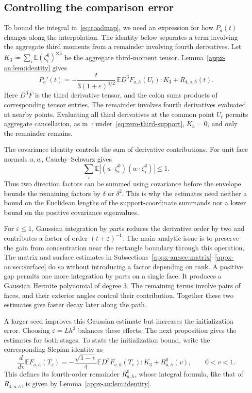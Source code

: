\documentclass[11pt,letterpaper]{article}
\theoremstyle{remark}
\newcommand{\E}{\mathbb E}
\begin{document}
\subsection{Controlling the comparison error}
\label{sec:outline-seeded}

To bound the integral in~\eqref{eq:roadmap}, we need an expression
for how \(P_a(t)\) changes along the interpolation. The identity below
separates a term involving the aggregate third moments from a remainder
involving fourth derivatives. Let
\(K_3\coloneqq\sum_i\E(\zeta_i^0)^{\otimes3}\) be the aggregate
third-moment tensor. Lemma~\ref{appx-an:lem:identity} gives
\begin{equation}
 P_a'(t)=
 -\frac{t}{3(1+\varepsilon)^{3/2}}\,
       \E D^3F_{a,h}(U_t):K_3+R_{4,a,h}(t).
 \label{eq:path-summary}
\end{equation}
Here \(D^3F\) is the third derivative tensor, and the colon sums
products of corresponding tensor entries. The remainder involves
fourth derivatives evaluated at nearby points. Evaluating all third
derivatives at the common point \(U_t\) permits aggregate cancellation,
as in~\cite[Lemma~22]{GaoZhang}: under~\eqref{eq:zero-third-support},
\(K_3=0\), and only the remainder remains.

The covariance identity controls the sum of derivative contributions.
For unit face normals \(u,w\), Cauchy--Schwarz gives
\[
 \sum_i\E|(u\cdot\zeta_i^0)(w\cdot\zeta_i^0)|\le1.
\]
Thus two direction factors can be summed using covariance before
the envelope bounds the remaining factors by \(\delta\) or
\(\delta^2\). This is why the estimates need neither a bound on the
Euclidean lengths of the support-coordinate summands nor a lower
bound on the positive covariance eigenvalues.

For \(\varepsilon\le1\), Gaussian integration by parts reduces the
derivative order by two and contributes a factor of order
\((t+\varepsilon)^{-1}\).
The main analytic issue is to preserve the gain from concentration
near the rectangle boundary through this operation.
The matrix and surface estimates in
Subsections~\ref{appx-an:sec:matrix}--\ref{appx-an:sec:surface}
do so without introducing a factor depending on rank. A positive gap
permits one more integration by parts on a single face. It produces a
Gaussian Hermite polynomial of degree \(3\). The remaining terms involve
pairs of faces, and their exterior angles control their contribution.
Together these two estimates give faster decay later along the path.

A larger seed improves this Gaussian estimate but increases the
initialization error. Choosing \(\varepsilon=Lh^2\) balances these
effects. The next proposition gives the estimates for both stages.
To state the initialization bound, write the corresponding Slepian
identity as
\[
 \frac{d}{dv}\E F_{a,h}(T_v)
 =-\frac{\sqrt{1-v}}4\E D^3F_{a,h}(T_v):K_3+R^0_{a,h}(v),
 \qquad 0<v<1.
\]
This defines its fourth-order remainder \(R^0_{a,h}\), whose integral
formula, like that of \(R_{4,a,h}\), is given by
Lemma~\ref{appx-an:lem:identity}.
\end{document}
